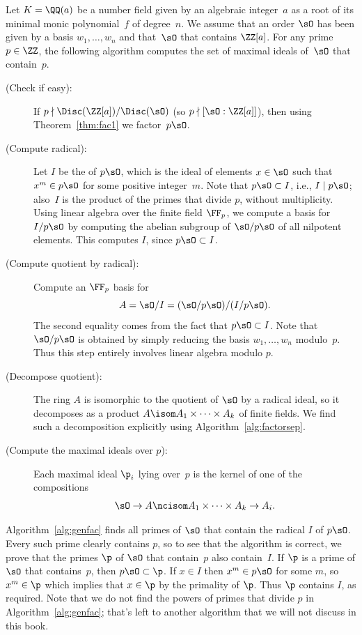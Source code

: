 \begin{algorithm}\label{alg:genfac}
  Let $K=\QQ(a)$ be a number field given by an algebraic integer~$a$
  as a root of its minimal monic polynomial~$f$ of degree~$n$.
  We assume that an order $\sO$ has been given by a basis $w_1,\ldots,w_n$
  and that~$\sO$ that contains $\ZZ[a]$.
  For any prime $p\in\ZZ$, the following algorithm computes the set of
  maximal ideals of~$\sO$ that contain~$p$.
  \begin{description}
    \item[\normalfont (Check if easy):] If $p \nmid \Disc(\ZZ[a]) / \Disc(\sO)$ (so
    $p \nmid [\sO:\ZZ[a]]$), then using Theorem~\ref{thm:fac1} we
    factor~$p\sO$.

    \item[\normalfont (Compute radical):]
    Let $I$ be the  of $p\sO$, which is the ideal of
    elements $x\in\sO$ such that $x^m\in p\sO$
    for some positive integer~$m$.  Note that $p\sO \subset I$, i.e.,
    $I\mid p\sO$; also~$I$ is the product
    of the primes that divide $p$, without multiplicity.
    Using linear algebra over the finite field
    $\FF_p$, we compute a basis for $I/p\sO$ by computing
    the abelian subgroup of $\sO/p\sO$ of all nilpotent
    elements.  This computes $I$, since $p\sO\subset I$.

    \item[\normalfont (Compute quotient by radical):]
    Compute an $\FF_p$ basis for
    $$
      A = \sO/I = (\sO/p\sO)/(I/p\sO).
    $$
    The second equality comes from the fact that $p\sO\subset I$.
    Note that $\sO/p\sO$
    is obtained by simply reducing the basis $w_1,\ldots, w_n$ modulo~$p$.
    Thus this step entirely involves linear algebra modulo $p$.

    \item[\normalfont (Decompose quotient):] The ring $A$ is isomorphic to
    the quotient of $\sO$ by a radical ideal,
    so it decomposes as a product
    $A \isom A_1 \times \cdots \times A_k$ of finite fields.
    We find such a decomposition explicitly using Algorithm~\ref{alg:factorsep}.

    \item[\normalfont (Compute the maximal ideals over $p$):] Each maximal ideal
    $\p_i$ lying over~$p$ is the kernel of one of the compositions
    $$
      \sO \to A \ncisom A_1 \times \cdots \times A_k \to A_i.
    $$
  \end{description}
\end{algorithm}
Algorithm~\ref{alg:genfac} finds all primes of $\sO$ that contain the radical $I$ of
$p\sO$.  Every such prime clearly contains $p$, so to see that the
algorithm is correct, we prove that the primes $\p$ of $\sO$ that
contain~$p$ also contain~$I$.  If $\p$ is a prime of $\sO$ that
contains~$p$, then $p\sO \subset \p$.  If $x\in I$ then $x^m\in p\sO$
for some $m$, so $x^m\in \p$ which implies that $x\in \p$ by the primality
of $\p$.  Thus $\p$ contains $I$, as required.  Note that we do not find the powers of
primes that divide $p$ in Algorithm~\ref{alg:genfac}; that's left to another
algorithm that we will not discuss in this book.

